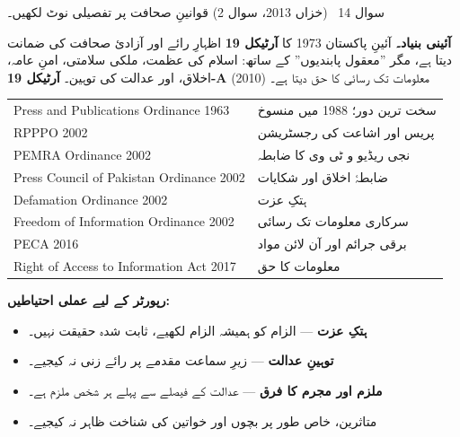 \begin{sawal}{سوال \textenglish{14} \ \textnormal{\small(خزاں \textenglish{2013}، سوال \textenglish{2})}}
قوانینِ صحافت پر تفصیلی نوٹ لکھیں۔
\end{sawal}

\begin{hal}
\textbf{آئینی بنیاد۔} آئینِ پاکستان \textenglish{1973} کا \textbf{آرٹیکل
\textenglish{19}} اظہارِ رائے اور آزادیٔ صحافت کی ضمانت دیتا ہے، مگر ''معقول
پابندیوں'' کے ساتھ: اسلام کی عظمت، ملکی سلامتی، امنِ عامہ، اخلاق، اور عدالت کی
توہین۔ \textbf{آرٹیکل \textenglish{19-A}} (\textenglish{2010}) معلومات تک
رسائی کا حق دیتا ہے۔

\medskip
\begin{center}
\begin{tabular}{@{}p{6.4cm} p{8.0cm}@{}}
\toprule
\textenglish{Press and Publications Ordinance 1963} & سخت ترین دور؛ \textenglish{1988} میں منسوخ \\
\textenglish{RPPPO 2002} & پریس اور اشاعت کی رجسٹریشن \\
\textenglish{PEMRA Ordinance 2002} & نجی ریڈیو و ٹی وی کا ضابطہ \\
\textenglish{Press Council of Pakistan Ordinance 2002} & ضابطۂ اخلاق اور شکایات \\
\textenglish{Defamation Ordinance 2002} & ہتکِ عزت \\
\textenglish{Freedom of Information Ordinance 2002} & سرکاری معلومات تک رسائی \\
\textenglish{PECA 2016} & برقی جرائم اور آن لائن مواد \\
\textenglish{Right of Access to Information Act 2017} & معلومات کا حق \\
\bottomrule
\end{tabular}
\end{center}

\medskip
\textbf{رپورٹر کے لیے عملی احتیاطیں:}
\begin{itemize}\setlength{\itemsep}{1pt}
  \item \textbf{ہتکِ عزت} --- الزام کو ہمیشہ الزام لکھیے، ثابت شدہ حقیقت نہیں۔
  \item \textbf{توہینِ عدالت} --- زیرِ سماعت مقدمے پر رائے زنی نہ کیجیے۔
  \item \textbf{ملزم اور مجرم کا فرق} --- عدالت کے فیصلے سے پہلے ہر شخص ملزم
        ہے۔
  \item متاثرین، خاص طور پر بچوں اور خواتین کی شناخت ظاہر نہ کیجیے۔
\end{itemize}

\end{hal}
